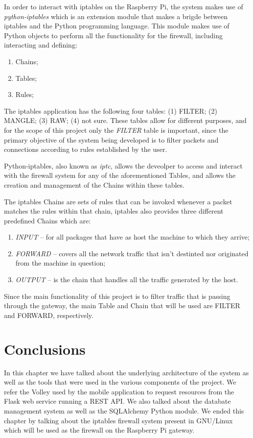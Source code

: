 In order to interact with iptables on the Raspberry Pi, the system makes use of
\emph{python-iptables} which is an extension module that makes a brigde between
iptables and the Python programming language.
This module makes use of Python objects to perform all the functionality for the
firewall, including interacting and defining:
\begin{enumerate}
	\item Chains;
	\item Tables;
	\item Rules;
\end{enumerate}

The iptables application has the following four tables: (1) FILTER; (2) MANGLE;
(3) RAW; (4) not sure. These tables allow for different purposes, and for the
scope of this project only the \emph{FILTER} table is important, since the
primary objective of the system being developed is to filter packets and
connections according to rules established by the user.

Python-iptables, also known as \emph{iptc}, allows the deveolper to access and
interact with the firewall system for any of the aforementioned Tables, and
allows the creation and management of the Chains within these tables.

The iptables Chains are sets of rules that can be invoked whenever a packet
matches the rules within that chain, iptables also provides three different
predefined Chains which are:
\begin{enumerate}
	\item \emph{INPUT} -- for all packages that have as host the machine to
		which they arrive;
	\item \emph{FORWARD} -- covers all the network traffic that isn't destinted
		nor originated from the machine in question;
	\item \emph{OUTPUT} -- is the chain that handles all the traffic generated
		by the host.
\end{enumerate}

Since the main functionality of this project is to filter traffic that is
passing through the gateway, the main Table and Chain that will be used are
FILTER and FORWARD, respectively.

\section{Conclusions}
\label{chap3:sec:concs}
In this chapter we have talked about the underlying architecture of the system
as well as the tools that were used in the various components of the project.
We refer the Volley used by the mobile application to request resources from the
Flask web service running a REST API. We also talked about the databate
management system as well as the SQLAlchemy Python module. We ended this chapter
by talking about the iptables firewall system present in GNU/Linux which will be
used as the firewall on the Raspberry Pi gateway.
